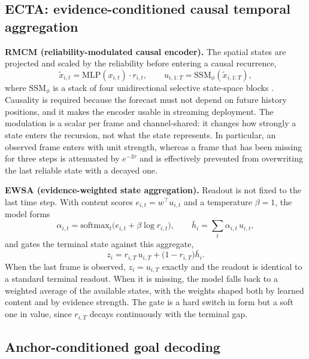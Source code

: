 \subsection{ECTA: evidence-conditioned causal temporal aggregation}
\label{sec:ecta}

\textbf{RMCM (reliability-modulated causal encoder).} The spatial states are projected and scaled by the reliability before entering a causal recurrence,
\begin{equation}
\tilde{x}_{i,t}=\mathrm{MLP}(x_{i,t})\cdot r_{i,t},
\qquad
u_{i,1:T}=\mathrm{SSM}_{\phi}(\tilde{x}_{i,1:T}),
\label{eq:rmcm}
\end{equation}
where $\mathrm{SSM}_{\phi}$ is a stack of four unidirectional selective state-space blocks \cite{gu2023mamba}. Causality is required because the forecast must not depend on future history positions, and it makes the encoder usable in streaming deployment. The modulation is a scalar per frame and channel-shared: it changes how strongly a state enters the recursion, not what the state represents. In particular, an observed frame enters with unit strength, whereas a frame that has been missing for three steps is attenuated by $e^{-3\tau}$ and is effectively prevented from overwriting the last reliable state with a decayed one.

\textbf{EWSA (evidence-weighted state aggregation).} Readout is not fixed to the last time step. With content scores $e_{i,t}=w^{\top}u_{i,t}$ and a temperature $\beta=1$, the model forms
\begin{equation}
\alpha_{i,t}=\mathrm{softmax}_{t}\big(e_{i,t}+\beta\log r_{i,t}\big),\qquad
\bar{h}_{i}=\sum_{t}\alpha_{i,t}\,u_{i,t},
\label{eq:ewsa}
\end{equation}
and gates the terminal state against this aggregate,
\begin{equation}
z_{i}=r_{i,T}\,u_{i,T}+\big(1-r_{i,T}\big)\bar{h}_{i}.
\label{eq:gate}
\end{equation}
When the last frame is observed, $z_{i}=u_{i,T}$ exactly and the readout is identical to a standard terminal readout. When it is missing, the model falls back to a weighted average of the available states, with the weights shaped both by learned content and by evidence strength. The gate is a hard switch in form but a soft one in value, since $r_{i,T}$ decays continuously with the terminal gap.

\subsection{Anchor-conditioned goal decoding}
\label{sec:decoder}

